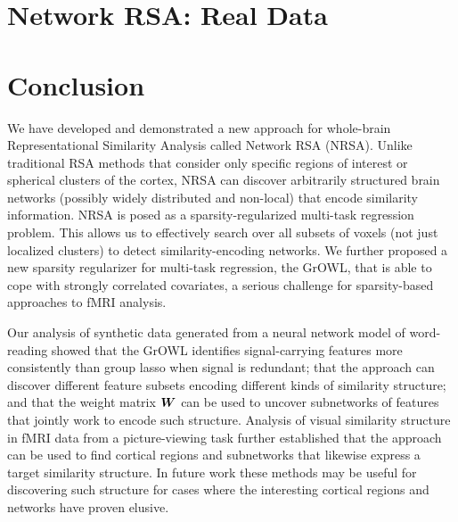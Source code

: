 \documentclass{article}
\begin{document}
	\section{Network RSA: Real Data}
        \label{wbrsa2}
	

	\section{Conclusion}

We have developed and demonstrated a new approach for whole-brain
Representational Similarity Analysis called Network RSA (NRSA). Unlike
traditional RSA methods that consider only specific regions of interest or
spherical clusters of the cortex,  NRSA can discover arbitrarily structured
brain networks (possibly widely distributed and non-local) that encode
similarity information.  NRSA is posed as a sparsity-regularized multi-task
regression problem. This allows us to effectively search over all subsets of
voxels (not just localized clusters) to detect similarity-encoding networks.  We
further proposed a new sparsity regularizer for multi-task regression, the
GrOWL, that is able to cope with strongly correlated covariates, a serious
challenge for sparsity-based approaches to fMRI analysis.

Our analysis of synthetic data generated from a neural network model of
word-reading showed that the GrOWL identifies signal-carrying features more
consistently than group lasso when signal is redundant; that the approach can
discover different feature subsets encoding different kinds of similarity
structure; and that the weight matrix $\boldsymbol{W}$ can be used to uncover subnetworks
of features that jointly work to encode such structure.  Analysis of visual
similarity structure in fMRI data from a picture-viewing task further
established that the approach can be used to find cortical regions and
subnetworks that likewise express a target similarity structure. In future work
these methods may be useful for discovering such structure for cases where the
interesting cortical regions and networks have proven elusive.




\end{document}
